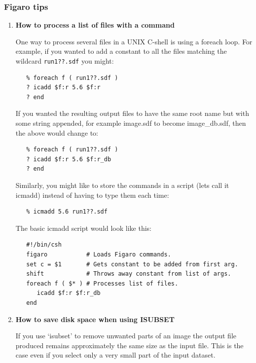 \documentclass[11pt,twoside]{article}
\begin{document}
\subsubsection{\label{news514_figaro_tips}Figaro tips}

\begin{enumerate}

\item {\bf How to process a list of files with a command}

      One way to process several files in a UNIX C-shell is using
      a foreach loop.  For example, if you wanted to add a constant
      to all the files matching the wildcard \verb+run1??.sdf+ you might:

\begin{verbatim}
   % foreach f ( run1??.sdf )
   ? icadd $f:r 5.6 $f:r
   ? end
\end{verbatim}

      If you wanted the resulting output files to have the same root
      name but with some string appended, for example image.sdf to
      become image\_db.sdf, then the above would change to:

\begin{verbatim}
   % foreach f ( run1??.sdf )
   ? icadd $f:r 5.6 $f:r_db
   ? end
\end{verbatim}

      Similarly, you might like to store the commands in a script
      (lets call it icmadd) instead of having to type them each time:

\begin{verbatim}
   % icmadd 5.6 run1??.sdf
\end{verbatim}

      The basic icmadd script would look like this:

\begin{verbatim}
   #!/bin/csh
   figaro           # Loads Figaro commands.
   set c = $1       # Gets constant to be added from first arg.
   shift            # Throws away constant from list of args.
   foreach f ( $* ) # Processes list of files.
      icadd $f:r $f:r_db
   end
\end{verbatim}

\item {\bf How to save disk space when using ISUBSET}

      If you use `isubset' to remove unwanted parts of an image the
      output file produced remains approximately the same size as the
      input file.  This is the case even if you select only a very
      small part of the input dataset.


\end{enumerate}
\end{document}
